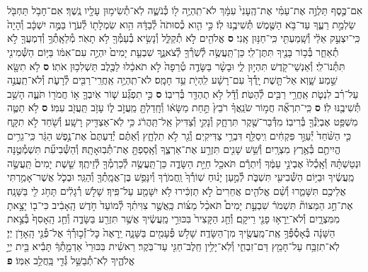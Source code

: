 \documentclass[twoside, openany, parskip=half, 11pt]{book}
\begin{document}
\begin{footnotesize}
\begin{multicols}{2}
\\
\\
אִם־כֶּ֣סֶף תַּלְוֶ֣ה אֶת־עַמִּ֗י אֶת־הֶֽעָנִי֙ עִמָּ֔ךְ לֹא־תִֽהְיֶ֥ה ל֖וֹ כְּ֯נֹשֶׁ֑ה לֹֽא־תְ֯שִׂימ֥וּן עָלָ֖יו נֶֽשֶׁךְ׃ אִם־חָבֹ֥ל תַּחְבֹּ֖ל שַׂלְמַ֣ת רֵעֶ֑ךָ עַד־בֹּ֥א הַשֶּׁ֖מֶשׁ תְּ֯שִׁיבֶ֥נּוּ לֽוֹ׃ כִּ֣י הִ֤וא כְ֯סוּתֹה֙ לְ֯בַדָּ֔הּ הִ֥וא שִׂמְלָת֖וֹ לְ֯עֹר֑וֹ בַּמֶּ֣ה יִשְׁכָּ֔ב וְ֯הָיָה֙ כִּֽי־יִצְעַ֣ק אֵלַ֔י וְ֯שָֽׁמַעְתִּ֖י כִּֽי־חַנּ֥וּן אָֽנִי׃ \textbf{ס}
אֱלֹהִ֖ים לֹ֣א תְ֯קַלֵּ֑ל וְ֯נָשִׂ֥יא בְ֯עַמְּ֯ךָ֖ לֹ֥א תָאֹֽר׃ מְ֯לֵאָֽתְ֯ךָ֥ וְ֯דִמְעֲךָ֖ לֹ֣א תְ֯אַחֵ֑ר בְּ֯כ֥וֹר בָּנֶ֖יךָ תִּתֶּן־לִֽי׃ כֵּן־תַּֽעֲשֶׂ֥ה לְ֯שֹֽׁרְ֯ךָ֖ לְ֯צֹאנֶ֑ךָ שִׁבְעַ֤ת יָמִים֙ יִהְיֶ֣ה עִם־אִמּ֔וֹ בַּיּ֥וֹם הַשְּׁ֯מִינִ֖י תִּתְּ֯נוֹ־לִֽי׃ וְ֯אַנְשֵׁי־קֹ֖דֶשׁ תִּהְי֣וּן לִ֑י וּבָשָׂ֨ר בַּשָּׂדֶ֤ה טְ֯רֵפָה֙ לֹ֣א תֹאכֵ֔לוּ לַכֶּ֖לֶב תַּשְׁלִכ֥וּן אֹתֽוֹ׃ \textbf{ס} לֹ֥א תִשָּׂ֖א שֵׁ֣מַע שָׁ֑וְא אַל־תָּ֤שֶׁת יָֽדְ֯ךָ֙ עִם־רָשָׁ֔ע לִֽהְיֹ֖ת עֵ֥ד חָמָֽס׃ לֹא־תִֽהְיֶ֥ה אַֽחֲרֵֽי־רַבִּ֖ים לְ֯רָעֹ֑ת וְ֯לֹא־תַֽעֲנֶ֣ה עַל־רִ֗ב לִנְטֹ֛ת אַֽחֲרֵ֥י רַבִּ֖ים לְ֯הַטֹּֽת׃ וְ֯דָ֕ל לֹ֥א תֶהְדַּ֖ר בְּ֯רִיבֽוֹ׃ \textbf{ס} כִּ֣י תִפְגַּ֞ע שׁ֧וֹר אֹֽיִבְךָ֛ א֥וֹ חֲמֹר֖וֹ תֹּעֶ֑ה הָשֵׁ֥ב תְּ֯שִׁיבֶ֖נּוּ לֽוֹ׃ \textbf{ס} כִּֽי־תִרְאֶ֞ה חֲמ֣וֹר שֹׂנַֽאֲךָ֗ רֹבֵץ֙ תַּ֣חַת מַשָּׂא֔וֹ וְ֯חָֽדַלְתָּ֖ מֵֽעֲזֹ֣ב ל֑וֹ עָזֹ֥ב תַּֽעֲזֹ֖ב עִמּֽוֹ׃ \textbf{ס}
לֹ֥א תַטֶּ֛ה מִשְׁפַּ֥ט אֶבְיֹֽנְ֯ךָ֖ בְּ֯רִיבֽוֹ׃ מִדְּ֯בַר־שֶׁ֖קֶר תִּרְחָ֑ק וְ֯נָקִ֤י וְ֯צַדִּיק֙ אַֽל־תַּֽהֲרֹ֔ג כִּ֥י לֹֽא־אַצְדִּ֖יק רָשָֽׁע׃ וְ֯שֹׁ֖חַד לֹ֣א תִקָּ֑ח כִּ֤י הַשֹּׁ֨חַד֙ יְ֯עַוֵּ֣ר פִּקְחִ֔ים וִֽיסַלֵּ֖ף דִּבְרֵ֥י צַדִּיקִֽים׃ וְ֯גֵ֖ר לֹ֣א תִלְחָ֑ץ וְ֯אַתֶּ֗ם יְ֯דַעְתֶּם֙ אֶת־נֶ֣פֶשׁ הַגֵּ֔ר כִּֽי־גֵרִ֥ים הֱיִיתֶ֖ם בְּ֯אֶ֥רֶץ מִצְרָֽיִם׃ וְ֯שֵׁ֥שׁ שָׁנִ֖ים תִּזְרַ֣ע אֶת־אַרְצֶ֑ךָ וְ֯אָֽסַפְתָּ֖ אֶת־תְּ֯בֽוּאָתָֽהּ׃ וְ֯הַשְּׁ֯בִיעִ֞ת תִּשְׁמְ֯טֶ֣נָּה וּנְטַשְׁתָּ֗הּ וְ֯אָֽכְ֯לוּ֙ אֶבְיֹנֵ֣י עַמֶּ֔ךָ וְ֯יִתְרָ֕ם תֹּאכַ֖ל חַיַּ֣ת הַשָּׂדֶ֑ה כֵּן־תַּֽעֲשֶׂ֥ה לְ֯כַרְמְ֯ךָ֖ לְ֯זֵיתֶֽךָ׃ שֵׁ֤שֶׁת יָמִים֙ תַּֽעֲשֶׂ֣ה מַֽעֲשֶׂ֔יךָ וּבַיּ֥וֹם הַשְּׁ֯בִיעִ֖י תִּשְׁבֹּ֑ת לְ֯מַ֣עַן יָנ֗וּחַ שֽׁוֹרְ֯ךָ֙ וַֽחֲמֹרֶ֔ךָ וְ֯יִנָּפֵ֥שׁ בֶּן־אֲמָֽתְ֯ךָ֖ וְ֯הַגֵּֽר׃ וּבְכֹ֛ל אֲשֶׁר־אָמַ֥רְתִּי אֲלֵיכֶ֖ם תִּשָּׁמֵ֑רוּ וְ֯שֵׁ֨ם אֱלֹהִ֤ים אֲחֵרִים֙ לֹ֣א תַזְכִּ֔ירוּ לֹ֥א יִשָּׁמַ֖ע עַל־פִּֽיךָ׃ שָׁלֹ֣שׁ רְ֯גָלִ֔ים תָּחֹ֥ג לִ֖י בַּשָּׁנָֽה׃ אֶת־חַ֣ג הַמַּצּוֹת֘ תִּשְׁמֹר֒ שִׁבְעַ֣ת יָמִים֩ תֹּאכַ֨ל מַצּ֜וֹת כַּֽאֲשֶׁ֣ר צִוִּיתִ֗ךָ לְ֯מוֹעֵד֙ חֹ֣דֶשׁ הָֽאָבִ֔יב כִּי־ב֖וֹ יָצָ֣אתָ מִמִּצְרָ֑יִם וְ֯לֹא־יֵֽרָא֥וּ פָנַ֖י רֵיקָֽם׃ וְ֯חַ֤ג הַקָּצִיר֙ בִּכּוּרֵ֣י מַֽעֲשֶׂ֔יךָ אֲשֶׁ֥ר תִּזְרַ֖ע בַּשָּׂדֶ֑ה וְ֯חַ֤ג הָֽאָסִף֙ בְּ֯צֵ֣את הַשָּׁנָ֔ה בְּ֯אָסְ֯פְּ֯ךָ֥ אֶֽת־מַֽעֲשֶׂ֖יךָ מִן־הַשָּׂדֶֽה׃ שָׁלֹ֥שׁ פְּ֯עָמִ֖ים בַּשָּׁנָ֑ה יֵֽרָאֶה֙ כׇּל־זְ֯כ֣וּרְ֯ךָ֔ אֶל־פְּ֯נֵ֖י הָֽאָדֹ֥ן יְיָ׃ לֹֽא־תִזְבַּ֥ח עַל־חָמֵ֖ץ דַּם־זִבְחִ֑י וְ֯לֹֽא־יָלִ֥ין חֵֽלֶב־חַגִּ֖י עַד־בֹּֽקֶר׃ רֵאשִׁ֗ית בִּכּוּרֵי֙ אַדְמָ֣תְ֯ךָ֔ תָּבִ֕יא בֵּ֖ית יְיָ֣ אֱלֹהֶ֑יךָ לֹֽא־תְ֯בַשֵּׁ֥ל גְּ֯דִ֖י בַּֽחֲלֵ֥ב אִמּֽוֹ׃ \textbf{פ}


\end{multicols}
\end{footnotesize}
\end{document}
